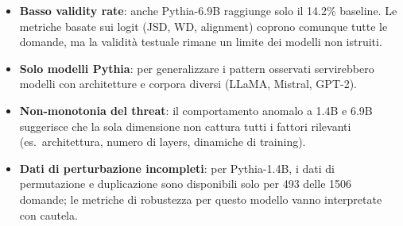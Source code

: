 \documentclass[../relazione.tex]{subfiles}
\begin{document}
\begin{itemize}
    \item \textbf{Basso validity rate}: anche Pythia-6.9B raggiunge solo il 14.2\% baseline. Le metriche basate sui logit (JSD, WD, alignment) coprono comunque tutte le domande, ma la validità testuale rimane un limite dei modelli non istruiti.
    \item \textbf{Solo modelli Pythia}: per generalizzare i pattern osservati servirebbero modelli con architetture e corpora diversi (LLaMA, Mistral, GPT-2).
    \item \textbf{Non-monotonia del threat}: il comportamento anomalo a 1.4B e 6.9B suggerisce che la sola dimensione non cattura tutti i fattori rilevanti (es.\ architettura, numero di layers, dinamiche di training).
    \item \textbf{Dati di perturbazione incompleti}: per Pythia-1.4B, i dati di permutazione e duplicazione sono disponibili solo per 493 delle 1506 domande; le metriche di robustezza per questo modello vanno interpretate con cautela.
\end{itemize}
\end{document}
